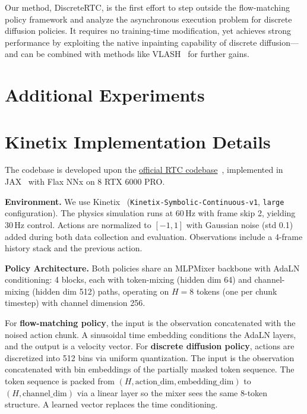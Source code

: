 \documentclass{article}
\begin{document}
Our method, DiscreteRTC, is the first effort to step outside the flow-matching policy framework and analyze the asynchronous execution problem for discrete diffusion policies. It requires no training-time modification, yet achieves strong performance by exploiting the native inpainting capability of discrete diffusion---and can be combined with methods like VLASH~\citep{tang2025vlash} for further gains.



\newpage
\section{Additional Experiments}
\label{app: addexp}



\newpage
\section{Kinetix Implementation Details}
\label{app: simexp}
The codebase is developed upon the \href{https://github.com/Physical-Intelligence/real-time-chunking-kinetix}{official RTC codebase}~\citep{black2025real}, implemented in JAX~\citep{jax2018github} with Flax NNx on 8 RTX 6000 PRO.

\textbf{Environment.}
We use Kinetix~\citep{matthews2024kinetix} (\texttt{Kinetix-Symbolic-Continuous-v1}, \texttt{large} configuration).
The physics simulation runs at 60\,Hz with frame skip 2, yielding 30\,Hz control.
Actions are normalized to $[-1, 1]$ with Gaussian noise (std 0.1) added during both data collection and evaluation.
Observations include a 4-frame history stack and the previous action.

\textbf{Policy Architecture.}
Both policies share an MLPMixer backbone with AdaLN conditioning: 4 blocks, each with token-mixing (hidden dim 64) and channel-mixing (hidden dim 512) paths, operating on $H{=}8$ tokens (one per chunk timestep) with channel dimension 256.

For \textbf{flow-matching policy}, the input is the observation concatenated with the noised action chunk.
A sinusoidal time embedding conditions the AdaLN layers, and the output is a velocity vector.
For \textbf{discrete diffusion policy}, actions are discretized into 512 bins via uniform quantization.
The input is the observation concatenated with bin embeddings of the partially masked token sequence.
The token sequence is packed from $(H, \text{action\_dim}, \text{embedding\_dim})$ to $(H, \text{channel\_dim})$ via a linear layer so the mixer sees the same 8-token structure.
A learned vector replaces the time conditioning.
\end{document}
